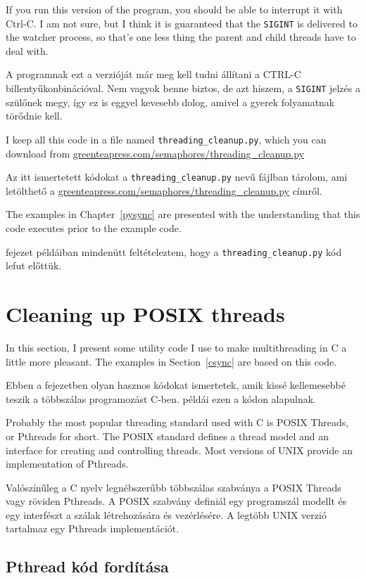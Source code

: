 \documentclass{book}
\begin{document}
If you run this version of the program, you should be able
to interrupt it with Ctrl-C.  I am not sure, but I think it
is guaranteed that the {\tt SIGINT} is delivered to the
watcher process, so that's one less thing the
parent and child threads have to deal with.

A programnak ezt a verzióját már meg kell tudni állítani a CTRL-C
billentyűkonbinációval. Nem vagyok benne biztos, de azt hiszem, a
{\tt SIGINT} jelzés a szülőnek megy, így ez is eggyel kevesebb dolog,
amivel a gyerek folyamatnak törődnie kell.

I keep all this code in a file named {\tt threading\_cleanup.py},
which you can download from
\url{greenteapress.com/semaphores/threading\_cleanup.py}

Az itt ismertetett kódokat a {\tt threading\_cleanup.py} nevű fájlban
tárolom, ami letölthető a \url{greenteapress.com/semaphores/threading\_cleanup.py}
címről.

The examples in Chapter~\ref{pysync} are presented with the understanding
that this code executes prior to the example code.

\Az{\ref{pysync}} fejezet példáiban mindenütt feltételeztem, hogy a
{\tt threading\_cleanup.py} kód lefut előttük.

\chapter{Cleaning up POSIX threads}
\label{ccleanup}

In this section, I present some utility code I use to make
multithreading in C a little more pleasant.  The examples in
Section~\ref{csync} are based on this code.

Ebben a fejezetben olyan hasznos kódokat ismertetek, amik
kissé kellemesebbé teszik a többszálas programozást C-ben.
\Az{\ref{csync}} példái ezen a kódon alapulnak.

Probably the most popular threading standard used with C is
POSIX Threads, or Pthreads for short.  The POSIX standard defines
a thread model and an interface for creating and controlling
threads.  Most versions of UNIX provide an implementation of
Pthreads.

Valószínűleg a C nyelv legnébszerűbb többszálas szabványa a
POSIX Threads vagy röviden Pthreads. A POSIX szabvány definiál
egy programszál modellt és egy interfészt a szálak létrehozására
és vezérlésére. A legtöbb UNIX verzió tartalmaz egy Pthreads
implementációt.

\section{Pthread kód fordítása}
\end{document}
